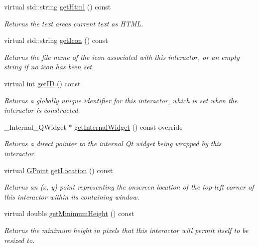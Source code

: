 \begin{DoxyCompactItemize}
virtual std\+::string \mbox{\hyperlink{classsgl_1_1GTextArea_a58d3b7767e049484e3d7507379e6ecc7}{get\+Html}} () const
\begin{DoxyCompactList}\small\item\em Returns the text area\textquotesingle{}s current text as H\+T\+ML. \end{DoxyCompactList}\item 
virtual std\+::string \mbox{\hyperlink{classsgl_1_1GInteractor_aaed62a73004939a64da6f0eb9eb64d73}{get\+Icon}} () const
\begin{DoxyCompactList}\small\item\em Returns the file name of the icon associated with this interactor, or an empty string if no icon has been set. \end{DoxyCompactList}\item 
virtual int \mbox{\hyperlink{classsgl_1_1GInteractor_a9c9659a6c6ba66b4107ba59c95a24241}{get\+ID}} () const
\begin{DoxyCompactList}\small\item\em Returns a globally unique identifier for this interactor, which is set when the interactor is constructed. \end{DoxyCompactList}\item 
\+\_\+\+Internal\+\_\+\+Q\+Widget $\ast$ \mbox{\hyperlink{classsgl_1_1GTextArea_a2f6b36b2517087dc90a366b5ce1f5323}{get\+Internal\+Widget}} () const override
\begin{DoxyCompactList}\small\item\em Returns a direct pointer to the internal Qt widget being wrapped by this interactor. \end{DoxyCompactList}\item 
virtual \mbox{\hyperlink{structsgl_1_1GPoint}{G\+Point}} \mbox{\hyperlink{classsgl_1_1GInteractor_a4f83802015511edeb63b892830812c11}{get\+Location}} () const
\begin{DoxyCompactList}\small\item\em Returns an (x, y) point representing the onscreen location of the top-\/left corner of this interactor within its containing window. \end{DoxyCompactList}\item 
virtual double \mbox{\hyperlink{classsgl_1_1GInteractor_aed4b0075fcc434499c3cb3e46896bda3}{get\+Minimum\+Height}} () const
\begin{DoxyCompactList}\small\item\em Returns the minimum height in pixels that this interactor will permit itself to be resized to. \end{DoxyCompactList}\item 

\end{DoxyCompactItemize}
